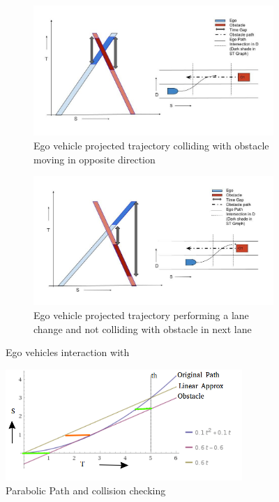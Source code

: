 \begin{figure}
	\centering
	\begin{subfigure}{.515\textwidth}
		\centering
		\includegraphics[width=1.0\textwidth]{Images/concept/dynamic_opposite_collision.jpg}
		\caption{Ego vehicle projected trajectory colliding with obstacle moving in opposite direction}
		\label{dynamic_opp1}
	\end{subfigure}%
	\begin{subfigure}{.485\textwidth}
		\centering
		\includegraphics[width=1.0\textwidth]{Images/concept/dynamic_opposite_nocollision.jpg}
		\caption{Ego vehicle projected trajectory performing a lane change and not colliding with obstacle in next lane}
		\label{dynamic_opp2}
	\end{subfigure}
	\caption{Ego vehicles interaction with }
	\label{dynamic_opp}
\end{figure}
\fi



 \begin{figure}
	\centering
	\includegraphics[width=0.8\textwidth]{Images/concept/dynamic_obstacle_new.png}
	\caption{Parabolic Path and collision checking}
	\label{dynamic_approx}
\end{figure}

